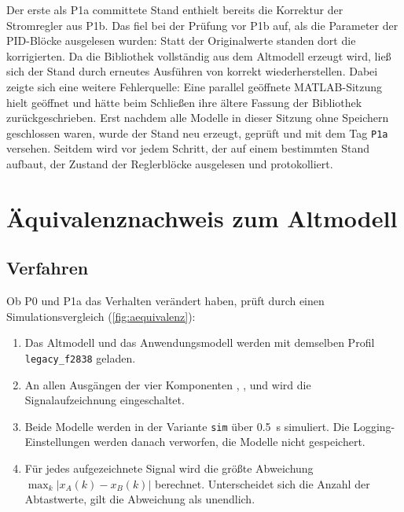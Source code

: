 Der erste als P1a committete Stand enthielt bereits die Korrektur der Stromregler aus P1b.
Das fiel bei der Prüfung vor P1b auf, als die Parameter der PID-Blöcke ausgelesen wurden:
Statt der Originalwerte standen dort die korrigierten. Da die Bibliothek vollständig aus dem
Altmodell erzeugt wird, ließ sich der Stand durch erneutes Ausführen von
 korrekt wiederherstellen. Dabei zeigte sich eine weitere
Fehlerquelle: Eine parallel geöffnete MATLAB-Sitzung hielt  geöffnet
und hätte beim Schließen ihre ältere Fassung der Bibliothek zurückgeschrieben. Erst nachdem
alle Modelle in dieser Sitzung ohne Speichern geschlossen waren, wurde der Stand neu erzeugt,
geprüft und mit dem Tag \texttt{P1a} versehen. Seitdem wird vor jedem Schritt, der auf einem
bestimmten Stand aufbaut, der Zustand der Reglerblöcke ausgelesen und protokolliert.

\section{Äquivalenznachweis zum Altmodell}
\label{sec:aequivalenz}

\subsection{Verfahren}

Ob P0 und P1a das Verhalten verändert haben, prüft  durch
einen Simulationsvergleich (\cref{fig:aequivalenz}):

\begin{enumerate}
  \item Das Altmodell und das Anwendungsmodell  werden mit demselben
    Profil \texttt{legacy\_f2838} geladen.
  \item An allen Ausgängen der vier Komponenten ,
    ,  und
     wird die Signalaufzeichnung eingeschaltet.
  \item Beide Modelle werden in der Variante \texttt{sim} über \SI{0,5}{\second} simuliert.
    Die Logging-Einstellungen werden danach verworfen, die Modelle nicht gespeichert.
  \item Für jedes aufgezeichnete Signal wird die größte Abweichung
    $\max_k |x_A(k) - x_B(k)|$ berechnet. Unterscheidet sich die Anzahl der Abtastwerte,
    gilt die Abweichung als unendlich.
\end{enumerate}

